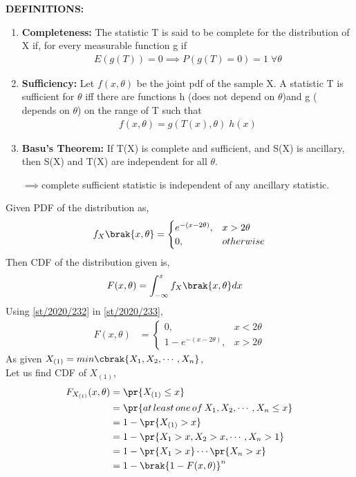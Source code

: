\textbf{DEFINITIONS:}
\begin{enumerate}
    \item \textbf{Completeness: }The statistic T is said to be complete for the distribution of X if, for every measurable function g
    if 
    \begin{align}
        E(g(T))=0\implies P(g(T)=0)=1\;\forall\theta
    \end{align}
    \item\textbf{Sufficiency: }
    Let $f(x,\theta)$ be the joint pdf of the sample X. A statistic T is sufficient for $\theta$ iff there are functions h (does not depend on $\theta$)and g ( depends on $\theta$) on the range of T such that
\begin{align}
    f(x,\theta)=g(T(x),\theta)\;h(x)
\end{align}
    \item\textbf{Basu's Theorem: }
    If T(X) is complete and sufficient, and S(X) is ancillary, then S(X) and T(X) are independent for all $\theta$.
    
    $\implies$complete sufficient statistic is independent of any ancillary statistic.
\end{enumerate}
Given PDF of the distribution as,
\begin{align}
f_X\brak{x,\theta}=
\begin{cases}
e^{-(x-2\theta)}, & x>2\theta
\\
0, & otherwise
\end{cases}\label{st/2020/232}
\end{align}
Then CDF of the distribution given is,
\begin{align}
    F(x,\theta)&=\int_{-\infty}^x f_X\brak{x,\theta} dx\label{st/2020/233}
\end{align}
Using \eqref{st/2020/232} in \eqref{st/2020/233},
\begin{align}
F(x,\theta)&=
\begin{cases}
0, & x<2\theta
\\
1-e^{-(x-2\theta)}, & x>2\theta
\end{cases}\label{st/2020/234}
\end{align}
As given $X_{(1)}=min\cbrak{X_1,X_2,\cdots,X_n}$,\\
Let us find CDF of $X_{(1)}$,
\begin{align}
  \nonumber  F_{X_{(1)}}(x,\theta)&=\pr{X_{(1)}\le x}\\
  \nonumber  &=\pr{at\,least\,one\, of\, X_1,X_2,\cdots,X_n \le x}\\
 \nonumber   &=1-\pr{X_{(1)}>x}\\
  \nonumber  &=1-\pr{X_1>x,X_2>x,\cdots,X_n>1}\\
  \nonumber &=1-\pr{X_1>x}\cdots \pr{X_n>x}\\
    &=1-\brak{1-F(x,\theta)}^n\label{st/2020/235}
\end{align}
